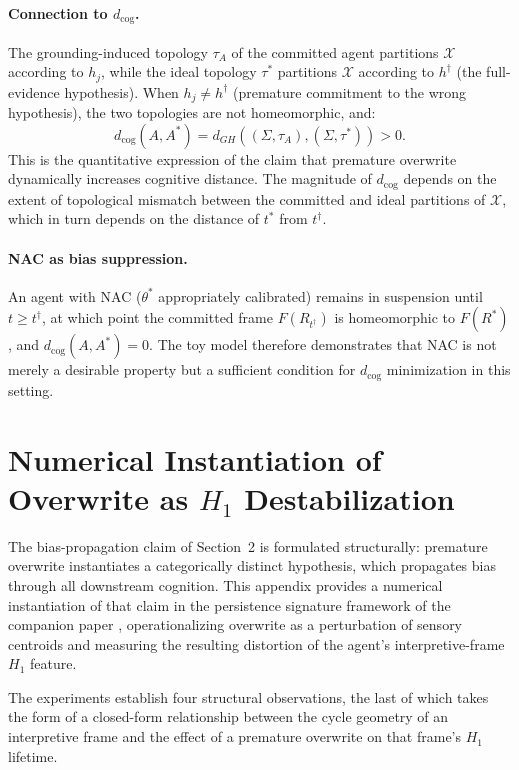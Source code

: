 \documentclass[12pt]{article}
\begin{document}
\paragraph{Connection to $d_\mathrm{cog}$.}
The grounding-induced topology $\tau_A$ of the committed agent
partitions $\mathcal{X}$ according to $h_j$, while the ideal topology
$\tau^*$ partitions $\mathcal{X}$ according to $h^\dagger$ (the
full-evidence hypothesis).
When $h_j \neq h^\dagger$ (premature commitment to the wrong hypothesis),
the two topologies are not homeomorphic, and:
\[
d_\mathrm{cog}(A, A^*) = d_{GH}((\Sigma, \tau_A), (\Sigma, \tau^*)) > 0.
\]
This is the quantitative expression of the claim that premature
overwrite dynamically increases cognitive distance.
The magnitude of $d_\mathrm{cog}$ depends on the extent of topological
mismatch between the committed and ideal partitions of $\mathcal{X}$,
which in turn depends on the distance of $t^*$ from $t^\dagger$.

\paragraph{NAC as bias suppression.}
An agent with NAC ($\theta^*$ appropriately calibrated) remains in
suspension until $t \geq t^\dagger$, at which point the committed
frame $F(R_{t^\dagger})$ is homeomorphic to $F(R^*)$, and
$d_\mathrm{cog}(A, A^*) = 0$.
The toy model therefore demonstrates that NAC is not merely a
desirable property but a sufficient condition for $d_\mathrm{cog}$
minimization in this setting.

\section{Numerical Instantiation of Overwrite as $H_1$
Destabilization}
\label{app:overwrite-h1}

The bias-propagation claim of Section~2 is formulated structurally:
premature overwrite instantiates a categorically distinct hypothesis,
which propagates bias through all downstream cognition. This appendix
provides a numerical instantiation of that claim in the persistence
signature framework of the companion paper
\cite{minamoto2026topology}, operationalizing overwrite as a
perturbation of sensory centroids and measuring the resulting
distortion of the agent's interpretive-frame $H_1$ feature.

The experiments establish four structural observations, the last
of which takes the form of a closed-form relationship between the
cycle geometry of an interpretive frame and the effect of a
premature overwrite on that frame's $H_1$ lifetime.
\end{document}
